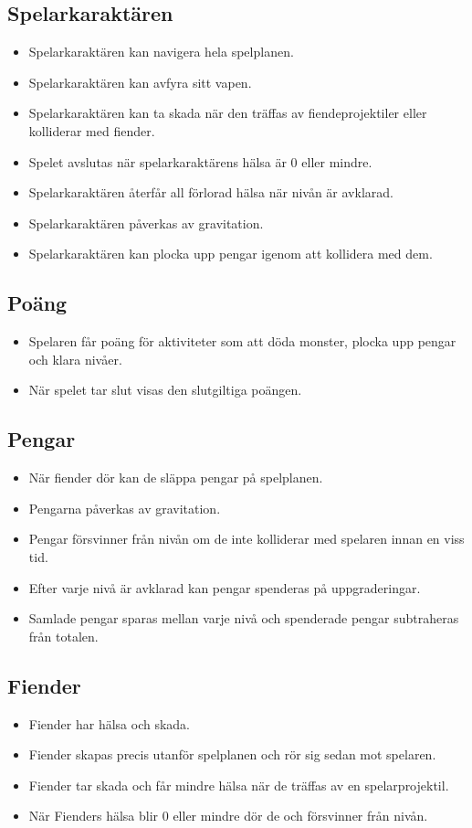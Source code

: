 \documentclass{TDP005mall}
\begin{document}
\subsection{Spelarkaraktären}
\begin{itemize}
\item Spelarkaraktären kan navigera hela spelplanen.
\item Spelarkaraktären kan avfyra sitt vapen.
\item Spelarkaraktären kan ta skada när den träffas av fiendeprojektiler eller kolliderar med fiender.
\item Spelet avslutas när spelarkaraktärens hälsa är 0 eller mindre.
\item Spelarkaraktären återfår all förlorad hälsa när nivån är avklarad.
\item Spelarkaraktären påverkas av gravitation.
\item Spelarkaraktären kan plocka upp pengar igenom att kollidera med dem.
\end{itemize}

\subsection{Poäng}
\begin{itemize}
\item Spelaren får poäng för aktiviteter som att döda  monster, plocka upp pengar och klara nivåer.
\item När spelet tar slut visas den slutgiltiga poängen.
\end{itemize}

\subsection{Pengar}
\begin{itemize}
\item När fiender dör kan de släppa pengar på spelplanen.
\item Pengarna påverkas av gravitation.
\item Pengar försvinner från nivån om de inte kolliderar med spelaren innan en viss tid.
\item Efter varje nivå är avklarad kan pengar spenderas på uppgraderingar.
\item Samlade pengar sparas mellan varje nivå och spenderade pengar subtraheras från totalen. 
\end{itemize}

\subsection{Fiender}
\begin{itemize}
\item Fiender har hälsa och skada.
\item Fiender skapas precis utanför spelplanen och rör sig sedan mot spelaren.
\item Fiender tar skada och får mindre hälsa när de träffas av en spelarprojektil.
\item När Fienders hälsa blir 0 eller mindre dör de och försvinner från nivån.
\end{itemize}
\end{document}
